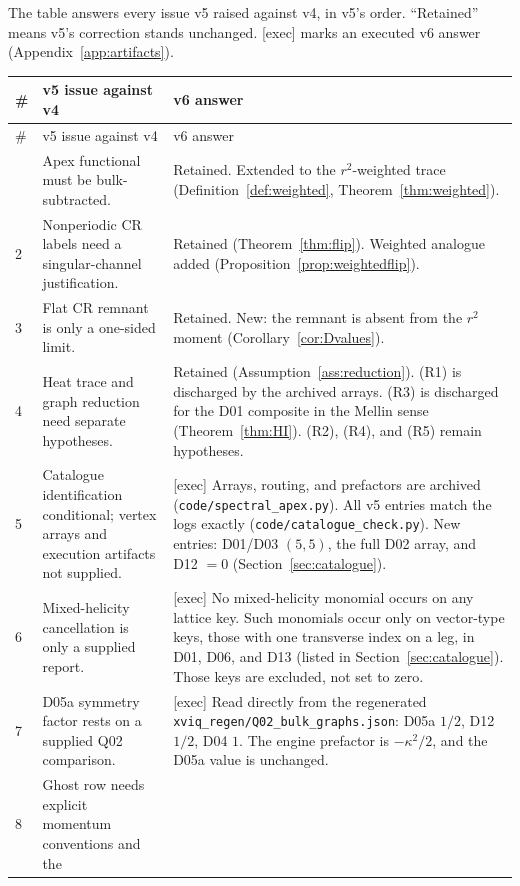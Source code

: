 \documentclass[11pt,a4paper]{article}
\newcommand{\ka}{\kappa}
\newcommand{\loc}[1]{\nolinkurl{#1}}
\theoremstyle{plain}
\theoremstyle{definition}
\theoremstyle{remark}
\numberwithin{equation}{section}
\begin{document}
The table answers every issue v5 raised against v4, in v5's order.
``Retained'' means v5's correction stands unchanged.
\textsf{[exec]} marks an executed v6 answer
(Appendix~\ref{app:artifacts}).

\begingroup
\small
\begin{longtable}{@{}L{.035\linewidth}L{.36\linewidth}L{.54\linewidth}@{}}
\toprule
\# & v5 issue against v4 & v6 answer\\
\midrule
\endfirsthead
\toprule
\# & v5 issue against v4 & v6 answer\\
\midrule
\endhead
\bottomrule
{} & Apex functional must be bulk-subtracted. &
Retained. Extended to the \(r^2\)-weighted trace
(Definition~\ref{def:weighted}, Theorem~\ref{thm:weighted}).\\
2 & Nonperiodic CR labels need a singular-channel justification. &
Retained (Theorem~\ref{thm:flip}). Weighted analogue added
(Proposition~\ref{prop:weightedflip}).\\
3 & Flat CR remnant is only a one-sided limit. &
Retained. New: the remnant is absent from the \(r^2\) moment
(Corollary~\ref{cor:Dvalues}).\\
4 & Heat trace and graph reduction need separate hypotheses. &
Retained (Assumption~\ref{ass:reduction}).
(R1) is discharged by the archived arrays.
(R3) is discharged for the D01 composite in the Mellin sense
(Theorem~\ref{thm:HI}).
(R2), (R4), and (R5) remain hypotheses.\\
5 & Catalogue identification conditional; vertex arrays and
execution artifacts not supplied. &
\textsf{[exec]} Arrays, routing, and prefactors are archived
(\loc{code/spectral_apex.py}).
All v5 entries match the logs exactly (\loc{code/catalogue_check.py}).
New entries: D01/D03 \((5,5)\), the full D02 array, and D12 \(=0\)
(Section~\ref{sec:catalogue}).\\
6 & Mixed-helicity cancellation is only a supplied report. &
\textsf{[exec]} No mixed-helicity monomial occurs on any lattice
key.
Such monomials occur only on vector-type keys, those with one
transverse index on a leg, in D01, D06, and D13 (listed in
Section~\ref{sec:catalogue}).
Those keys are excluded, not set to zero.\\
7 & D05a symmetry factor rests on a supplied Q02 comparison. &
\textsf{[exec]} Read directly from the regenerated
\loc{xviq_regen/Q02_bulk_graphs.json}: D05a \(1/2\), D12 \(1/2\),
D04 \(1\).
The engine prefactor is \(-\ka^2/2\), and the D05a value is
unchanged.\\
8 & Ghost row needs explicit momentum conventions and the

\end{longtable}
\end{document}

